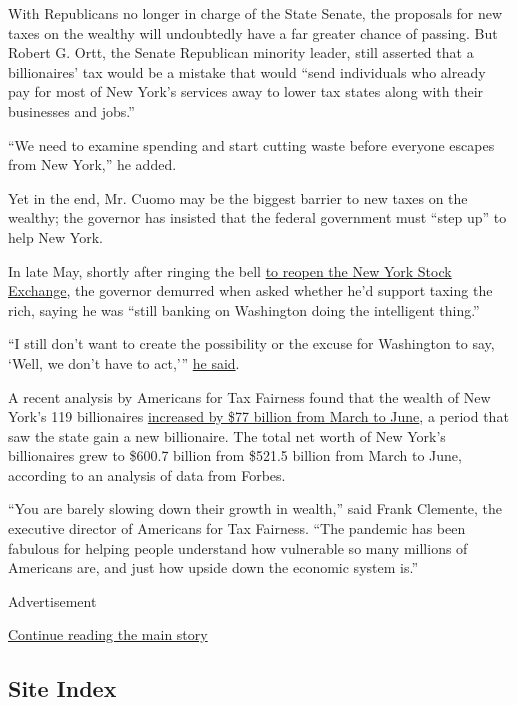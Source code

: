 With Republicans no longer in charge of the State Senate, the proposals
for new taxes on the wealthy will undoubtedly have a far greater chance
of passing. But Robert G. Ortt, the Senate Republican minority leader,
still asserted that a billionaires' tax would be a mistake that would
``send individuals who already pay for most of New York's services away
to lower tax states along with their businesses and jobs.''

``We need to examine spending and start cutting waste before everyone
escapes from New York,'' he added.

Yet in the end, Mr. Cuomo may be the biggest barrier to new taxes on the
wealthy; the governor has insisted that the federal government must
``step up'' to help New York.

In late May, shortly after ringing the bell
\href{https://www.governor.ny.gov/news/video-photos-amid-ongoing-covid-19-pandemic-governor-cuomo-rings-opening-bell-new-york-stock}{to
reopen the New York Stock Exchange}, the governor demurred when asked
whether he'd support taxing the rich, saying he was ``still banking on
Washington doing the intelligent thing.''

``I still don't want to create the possibility or the excuse for
Washington to say, `Well, we don't have to act,'''
\href{https://www.youtube.com/watch?v=v9MFvDGjI64}{he said}.

A recent analysis by Americans for Tax Fairness found that the wealth of
New York's 119 billionaires
\href{https://americansfortaxfairness.org/state-reports-billionaires-wealth-growth-coronavirus-pandemic-march-june-2020/}{increased
by \$77 billion from March to June}, a period that saw the state gain a
new billionaire. The total net worth of New York's billionaires grew to
\$600.7 billion from \$521.5 billion from March to June, according to an
analysis of data from Forbes.

``You are barely slowing down their growth in wealth,'' said Frank
Clemente, the executive director of Americans for Tax Fairness. ``The
pandemic has been fabulous for helping people understand how vulnerable
so many millions of Americans are, and just how upside down the economic
system is.''

Advertisement

\protect\hyperlink{after-bottom}{Continue reading the main story}

\hypertarget{site-index}{%
\subsection{Site Index}\label{site-index}}

